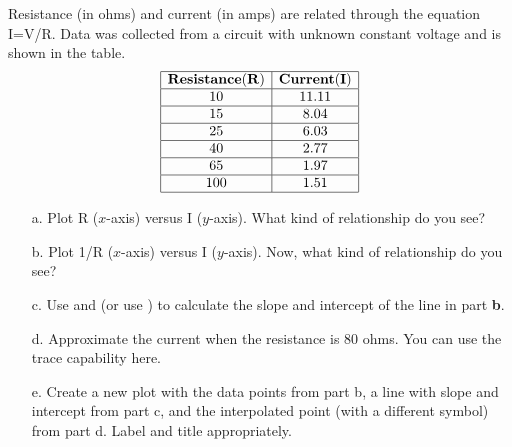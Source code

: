 {Resistance (in ohms) and current (in amps) are related through the equation I=V/R.  Data was collected from a circuit with unknown constant voltage and is shown in the table.
\[
\begin{array}{|c|c|}
\hline
{\bf Resistance (R) } & {\bf Current (I)} \\ \hline
10&	11.11\\ \hline
15&	8.04\\ \hline
25&	6.03\\ \hline
40&	2.77\\ \hline
65&	1.97\\ \hline
100&	1.51\\
\hline
\end{array}
\]
\begin{enumerate}
\item[a.] Plot R ($x$-axis) versus I ($y$-axis).  What kind of relationship do you see?
\item[b.] Plot 1/R ($x$-axis) versus I ($y$-axis).  Now, what kind of relationship do you see?
\item[c.] Use  and  (or use ) to calculate the slope and intercept of the line in part {\bf b}.  
\item[d.] Approximate the current when the resistance is 80 ohms.  You can use the trace capability here.
\item[e.] Create a new plot with the data points from part b, a line with slope and intercept from part c, and the interpolated point (with a different symbol) from part d.  Label and title appropriately.
\end{enumerate}}
{}
%
